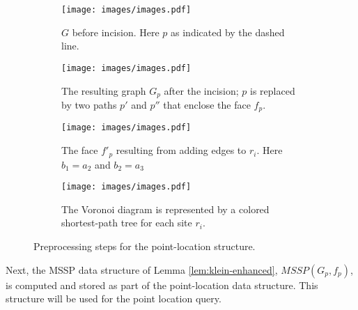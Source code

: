 \documentclass[a4paper,UKenglish,cleveref, autoref, thm-restate]{article}
\begin{document}
\begin{figure}
\centering
\begin{subfigure}{.49\textwidth}
  \centering
  \texttt{[image: images/images.pdf]}
  \caption{$G$ before incision. Here $p$ as indicated by the dashed line.}
  \label{fig:incision}
\end{subfigure}%
\hfill
\begin{subfigure}{.49\textwidth}
  \centering
  \texttt{[image: images/images.pdf]}
  \caption{The resulting graph $G_p$ after the incision; $p$ is replaced by two paths $p'$ and $p''$ that enclose the face $f_p$.}
  \label{fig:incision2}
\end{subfigure}
\vfill
\begin{subfigure}{.49\textwidth}
  \centering
  \texttt{[image: images/images.pdf]}
  \caption{The face $f'_p$ resulting from adding edges to $r_i$. Here $b_1=a_2$ and $b_2=a_3$}
  \label{fig:fp}
\end{subfigure}
\hfill
\begin{subfigure}{.49\textwidth}
  \centering
  \texttt{[image: images/images.pdf]}
  \caption{The Voronoi diagram is represented by a colored shortest-path tree for each site $r_i$.}
  \label{fig:voronoi}
\end{subfigure}
\caption{Preprocessing steps for the point-location structure.}
\end{figure}

Next, the MSSP data structure of Lemma \ref{lem:klein-enhanced}, $\textit{MSSP}(G_p,f_p)$, is computed and stored as part of the point-location data structure. This structure will be used for the point location query.
\end{document}
